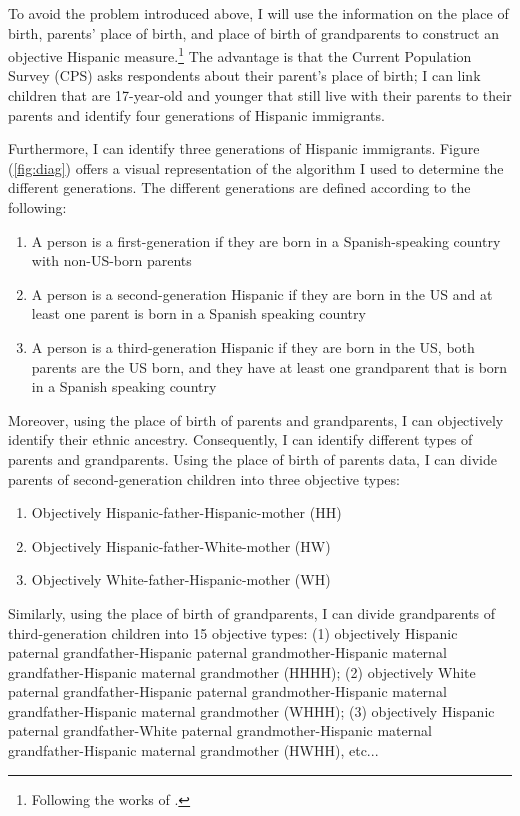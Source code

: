 \documentclass[12pt, fullpage]{article}
\begin{document}


To avoid the problem introduced above, I will use the information on the place of birth, parents' place of birth, and place of birth of grandparents to construct an objective Hispanic measure.\footnote{Following the works of \citet{antmanEthnicAttritionObserved2016,antmanEthnicAttritionAssimilation2020}.} The advantage is that the Current Population Survey (CPS) asks respondents about their parent's place of birth; I can link children that are 17-year-old and younger that still live with their parents to their parents and identify four generations of Hispanic immigrants. 


Furthermore, I can identify three generations of Hispanic immigrants. Figure (\ref{fig:diag}) offers a visual representation of the algorithm I used to determine the different generations. The different generations are defined according to the following: 

\begin{enumerate}
\item A person is a first-generation if they are born in a Spanish-speaking country with non-US-born parents
\item A person is a second-generation Hispanic if they are born in the US and at least one parent is born in a Spanish speaking country
\item A person is a third-generation Hispanic if they are born in the US, both parents are the US born, and they have at least one grandparent that is born in a Spanish speaking country
\end{enumerate}

Moreover, using the place of birth of parents and grandparents, I can objectively identify their ethnic ancestry. Consequently, I can identify different types of parents and grandparents. Using the place of birth of parents data, I can divide parents of second-generation children into three objective types: 
\begin{enumerate}
\item Objectively Hispanic-father-Hispanic-mother (HH)
\item Objectively Hispanic-father-White-mother (HW)
\item Objectively White-father-Hispanic-mother (WH)
\end{enumerate}

Similarly, using the place of birth of grandparents, I can divide grandparents of third-generation children into 15 objective types: (1) objectively Hispanic paternal grandfather-Hispanic paternal grandmother-Hispanic maternal grandfather-Hispanic maternal grandmother (HHHH); (2) objectively White paternal grandfather-Hispanic paternal grandmother-Hispanic maternal grandfather-Hispanic maternal grandmother (WHHH); (3) objectively Hispanic paternal grandfather-White paternal grandmother-Hispanic maternal grandfather-Hispanic maternal grandmother (HWHH), etc...
\end{document}
